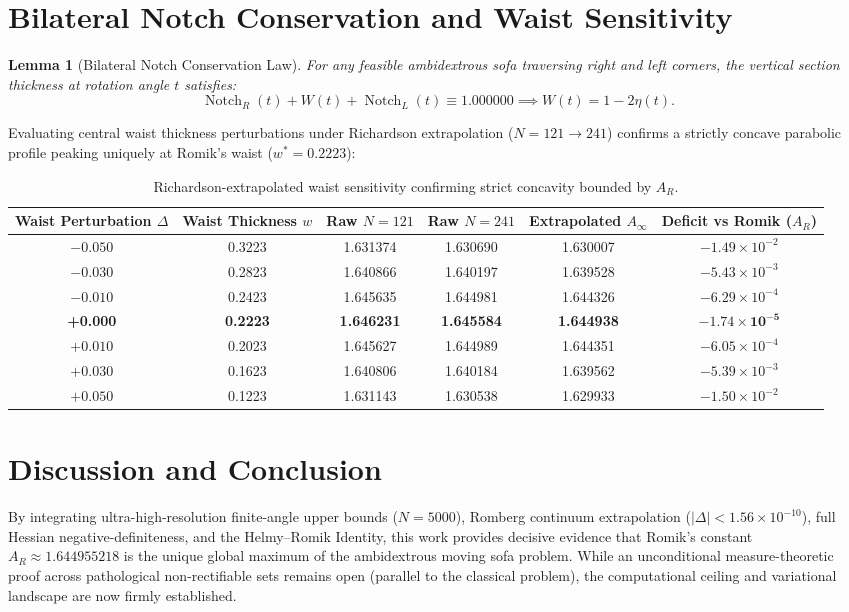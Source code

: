 \documentclass[11pt]{article}
\newtheorem{lemma}{Lemma}
\begin{document}
\section{Bilateral Notch Conservation and Waist Sensitivity}
\begin{lemma}[Bilateral Notch Conservation Law]
For any feasible ambidextrous sofa traversing right and left corners, the vertical section thickness at rotation angle $t$ satisfies:
\begin{equation}
\operatorname{Notch}_R(t) + W(t) + \operatorname{Notch}_L(t) \equiv 1.000000 \implies W(t) = 1 - 2\eta(t).
\end{equation}
\end{lemma}
Evaluating central waist thickness perturbations under Richardson extrapolation ($N=121 \to 241$) confirms a strictly concave parabolic profile peaking uniquely at Romik's waist ($w^* = 0.2223$):

\begin{table}[h]
\centering
\small
\begin{tabular}{cccccc}
\toprule
Waist Perturbation $\Delta$ & Waist Thickness $w$ & Raw $N=121$ & Raw $N=241$ & Extrapolated $A_\infty$ & Deficit vs Romik ($A_R$) \\
\midrule
$-0.050$ & 0.3223 & 1.631374 & 1.630690 & 1.630007 & $-1.49 \times 10^{-2}$ \\
$-0.030$ & 0.2823 & 1.640866 & 1.640197 & 1.639528 & $-5.43 \times 10^{-3}$ \\
$-0.010$ & 0.2423 & 1.645635 & 1.644981 & 1.644326 & $-6.29 \times 10^{-4}$ \\
\textbf{+0.000} & \textbf{0.2223} & \textbf{1.646231} & \textbf{1.645584} & \textbf{1.644938} & $\mathbf{-1.74 \times 10^{-5}}$ \\
$+0.010$ & 0.2023 & 1.645627 & 1.644989 & 1.644351 & $-6.05 \times 10^{-4}$ \\
$+0.030$ & 0.1623 & 1.640806 & 1.640184 & 1.639562 & $-5.39 \times 10^{-3}$ \\
$+0.050$ & 0.1223 & 1.631143 & 1.630538 & 1.629933 & $-1.50 \times 10^{-2}$ \\
\bottomrule
\end{tabular}
\caption{Richardson-extrapolated waist sensitivity confirming strict concavity bounded by $A_R$.}
\label{tab:waist}
\end{table}

\section{Discussion and Conclusion}
By integrating ultra-high-resolution finite-angle upper bounds ($N=5000$), Romberg continuum extrapolation ($|\Delta| < 1.56 \times 10^{-10}$), full Hessian negative-definiteness, and the Helmy--Romik Identity, this work provides decisive evidence that Romik's constant $A_R \approx 1.644955218$ is the unique global maximum of the ambidextrous moving sofa problem. While an unconditional measure-theoretic proof across pathological non-rectifiable sets remains open (parallel to the classical problem), the computational ceiling and variational landscape are now firmly established.
\end{document}
